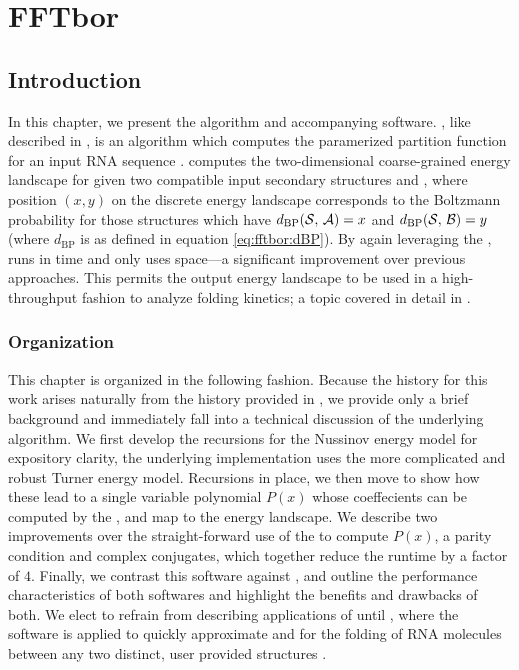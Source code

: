 
\chapter{FFTbor\twoD}
\label{ch:ffttwo}


\section{Introduction}
\label{sec:ffttwo:intro}

In this chapter, we present the \ffttwo algorithm and accompanying software.
\ffttwo, like \fftbor described in , is an algorithm
which computes the paramerized partition function for an input RNA sequence
\seq. \ffttwo computes the two-dimensional coarse-grained energy landscape for \seq
given two compatible input secondary structures \strA and \strB, where position
$(x,y)$ on the discrete energy landscape corresponds to the Boltzmann
probability for those structures \str which have $d_{\text{BP}}(\mathcal S,\,\mathcal A)=x$ and
$d_{\text{BP}}(\mathcal S,\,\mathcal B)=y$ (where $d_{\text{BP}}$ is as defined in
equation \ref{eq:fftbor:dBP}). By again leveraging the \fft, \ffttwo runs in 
time and only uses  space---a significant improvement over previous
approaches. This permits the output energy landscape to be used in a
high-throughput fashion to analyze folding kinetics; a topic covered in detail
in .

\subsection{Organization}
\label{subsec:ffttwo:org}

This chapter is organized in the following fashion. Because the history for
this work arises naturally from the history provided in
, we provide only a brief background
and immediately fall into
a technical discussion of the underlying algorithm. We first develop the
recursions for the Nussinov energy model for expository clarity, the
underlying implementation uses the more complicated and robust Turner energy
model. Recursions in place, we then move to show how these lead to
a single variable polynomial $P(x)$ whose coeffecients can be computed by
the \idft, and map to the \twoD energy landscape. We describe two improvements over
the straight-forward use of the \fft to compute $P(x)$,
a parity condition and complex conjugates, which together reduce the
runtime by a factor of $4$. Finally, we contrast this software against \rnatwofold,
and outline the performance characteristics of both softwares and highlight
the benefits and drawbacks of both. We elect to refrain from describing
applications of \ffttwo until , where the software is
applied to quickly approximate \mfpt and \eqt for the folding of RNA molecules
between any two distinct, user provided structures \strAB.

